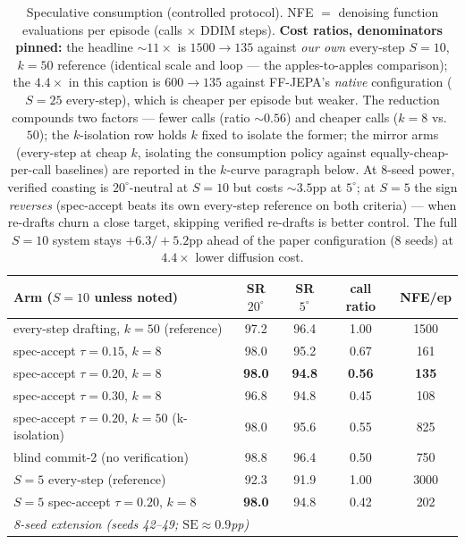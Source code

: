 \documentclass{article}
\newcommand{\ours}[1]{\textbf{#1}}          %
\newcommand{\degc}[1]{$#1^\circ$}
\begin{document}
\begin{table}[h]
\centering
\caption{Speculative consumption (controlled protocol). NFE $=$ denoising function
evaluations per episode (calls $\times$ DDIM steps). \textbf{Cost ratios, denominators
pinned:} the headline ${\sim}11\times$ is $1500{\to}135$ against \emph{our own}
every-step $S{=}10$, $k{=}50$ reference (identical scale and loop --- the
apples-to-apples comparison); the $4.4\times$ in this caption is $600{\to}135$ against
FF-JEPA's \emph{native} configuration ($S{=}25$ every-step), which is cheaper per
episode but weaker. The reduction compounds two factors --- fewer calls (ratio
${\sim}0.56$) and cheaper calls ($k{=}8$ vs.\ $50$); the $k$-isolation row holds $k$
fixed to isolate the former; the mirror arms (every-step at cheap $k$, isolating the
consumption policy against equally-cheap-per-call baselines) are reported in the
$k$-curve paragraph below.
At 8-seed power, verified coasting
is \degc{20}-neutral at $S{=}10$ but costs ${\sim}3.5$pp at \degc{5}; at $S{=}5$ the sign
\emph{reverses} (spec-accept beats its own every-step reference on both criteria) --- when
re-drafts churn a close target, skipping verified re-drafts is better control. The full
$S{=}10$ system stays $+6.3/+5.2$pp ahead of the paper configuration (8 seeds) at
$4.4\times$ lower diffusion cost.}
\label{tab:spec}
\begin{tabular}{lcccc}
\toprule
Arm ($S{=}10$ unless noted) & SR \degc{20} & SR \degc{5} & call ratio & NFE/ep \\
\midrule
every-step drafting, $k{=}50$ (reference)          & 97.2 & 96.4 & 1.00 & 1500 \\
spec-accept $\tau{=}0.15$, $k{=}8$                  & 98.0 & 95.2 & 0.67 & 161 \\
spec-accept $\tau{=}0.20$, $k{=}8$                  & \ours{98.0} & \ours{94.8} & \ours{0.56} & \ours{135} \\
spec-accept $\tau{=}0.30$, $k{=}8$                  & 96.8 & 94.8 & 0.45 & 108 \\
spec-accept $\tau{=}0.20$, $k{=}50$ (k-isolation)   & 98.0 & 95.6 & 0.55 & 825 \\
blind commit-2 (no verification)                   & 98.8 & 96.4 & 0.50 & 750 \\
\midrule
$S{=}5$ every-step (reference)                     & 92.3 & 91.9 & 1.00 & 3000 \\
$S{=}5$ spec-accept $\tau{=}0.20$, $k{=}8$          & \ours{98.0} & 94.8 & 0.42 & 202 \\
\midrule
\multicolumn{5}{l}{\emph{8-seed extension (seeds 42--49; $\mathrm{SE}\approx0.9$pp)}} \\

\end{tabular}
\end{table}
\end{document}
